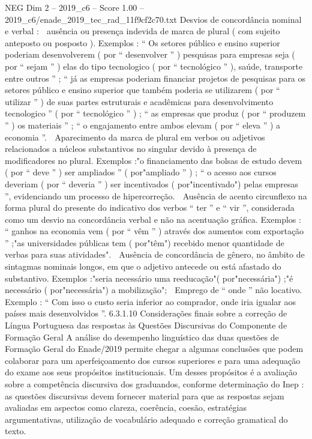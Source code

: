 \begin{textsample}{NEG Dim 2 – 2019\_c6 – Score 1.00 – 2019\_c6/enade\_2019\_tec\_rad\_11f9cf2c70.txt}
Desvios de concordância nominal e verbal :  ausência ou presença indevida de marca de plural ( com sujeito anteposto ou posposto ).
Exemplos : “ Os setores público e ensino superior poderiam desenvolverem ( por “ desenvolver ” ) pesquisas para empresas seja ( por “ sejam ” ) elas do tipo tecnologico ( por “ tecnológico ” ), saúde, transporte entre outros ” ; “ já as empresas poderiam financiar projetos de pesquisas para os setores público e ensino superior que também poderia se utilizarem ( por “ utilizar ” ) de suas partes estruturais e acadêmicas para desenvolvimento tecnologico ” ( por “ tecnológico ” ) ; “ as empresas que produz ( por “ produzem ” ) os materiais ” ; “ o engajamento entre ambos elevam ( por “ eleva ” ) a economia ”.  Aparecimento da marca de plural em verbos ou adjetivos relacionados a núcleos substantivos no singular devido à presença de modificadores no plural.
Exemplos :"o financiamento das bolsas de estudo devem ( por “ deve ” ) ser ampliados ” ( por"ampliado ” ) ; “ o acesso aos cursos deveriam ( por “ deveria ” ) ser incentivados ( por"incentivado") pelas empresas ”, evidenciando um processo de hipercorreção.  Ausência de acento circunflexo na forma plural do presente do indicativo dos verbos “ ter ” e “ vir ”, considerada como um desvio na concordância verbal e não na acentuação gráfica.
Exemplos : “ ganhos na economia vem ( por “ vêm ” ) através dos aumentos com exportação ” ;"as universidades públicas tem ( por"têm") recebido menor quantidade de verbas para suas atividades".  Ausência de concordância de gênero, no âmbito de sintagmas nominais longos, em que o adjetivo antecede ou está afastado do substantivo.
Exemplos :"seria necessário uma reeducação"( por"necessária") ;"é necessário ( por"necessária") a mobilização";  Emprego de “ onde ” não locativo.
Exemplo : “ Com isso o custo seria inferior ao comprador, onde iria igualar aos países mais desenvolvidos ”. 6.3.1.10 Considerações finais sobre a correção de Língua Portuguesa das respostas às Questões Discursivas do Componente de Formação Geral A análise do desempenho linguístico das duas questões de Formação Geral do Enade/2019 permite chegar a algumas conclusões que podem colaborar para um aperfeiçoamento dos cursos superiores e para uma adequação do exame aos seus propósitos institucionais.
Um desses propósitos é a avaliação sobre a competência discursiva dos graduandos, conforme determinação do Inep : as questões discursivas devem fornecer material para que as respostas sejam avaliadas em aspectos como clareza, coerência, coesão, estratégias argumentativas, utilização de vocabulário adequado e correção gramatical do texto.

\end{textsample}
